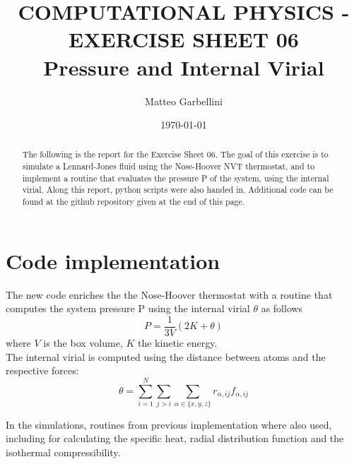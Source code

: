 \documentclass[aps,pra,reprint, onecolumn, rmp]{revtex4-2}
\begin{document}
\title{COMPUTATIONAL PHYSICS - EXERCISE SHEET 06 \\Pressure and Internal Virial}

\author{Matteo Garbellini}


\date{\today}

\begin{abstract}
The following is the report for the Exercise Sheet 06. The goal of this exercise is to simulate a Lennard-Jones fluid using the Nose-Hoover NVT thermostat, and to implement a routine that evaluates the pressure P of the system, using the internal virial. Along this report, python scripts were also handed in. Additional code can be found at the github repository given at the end of this page.
\end{abstract}


\maketitle



\section{Code implementation}
The new code enriches the the Nose-Hoover thermostat with a routine that computes the system pressure P using the internal virial $\theta$ as follows
\begin{equation}
	P = \frac{1}{3V}(2K + \theta)
\end{equation}
where $V$ is the box volume, $K$ the kinetic energy. \\
The internal virial is computed using the distance between atoms and the respective forces:
\begin{equation}
	\theta = \sum_{i=1}^N\sum_{j>i}\sum_{\alpha\in\{x,y,z\}}r_{\alpha,ij}f_{\alpha,ij}
\end{equation}


In the simulations, routines from previous implementation where also used, including for calculating the specific heat, radial distribution function and the isothermal compressibility.
\end{document}
